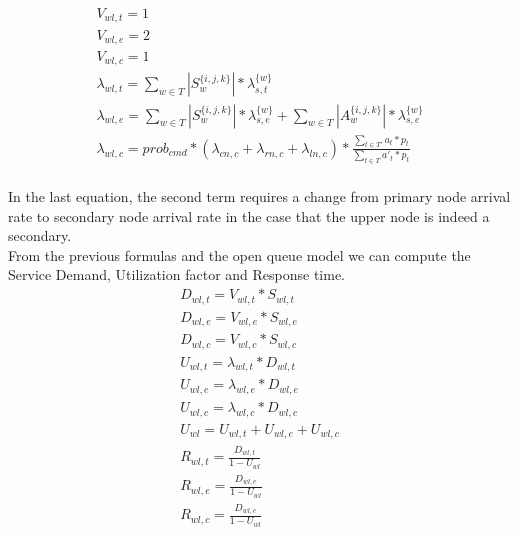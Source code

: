 \documentclass[11pt]{article}
\begin{document}
\begin{equation}
    \begin{array}{l}
        V_{wl, t} = 1 \\
        V_{wl, e} = 2 \\ %
        V_{wl,c} = 1 \\
        \lambda_{wl, t} = \sum\limits_{w \in T}{| S^{\{i,j,k\}}_{w} | * \lambda^{\{w\}}_{s, t}}  \\
        \lambda_{wl, e} = \sum\limits_{w \in T}{| S^{\{i,j,k\}}_{w} | * \lambda^{\{w\}}_{s, e}} + \sum\limits_{w \in T}{| A^{\{i,j,k\}}_{w} | * \lambda^{\{w\}}_{s, e}}\\
		\lambda_{wl, c} = prob_{cmd} * (\lambda_{cn, c} + \lambda_{rn, c} + \lambda_{ln, c}) * \frac{\sum\limits_{t \in T'}{a_{t} * p_{t}}}{\sum\limits_{t \in T}{a'_{t} * p_{t}}}  \\\


    \end{array}
\end{equation}







In the last equation, the second term requires a change from primary node arrival rate to secondary node arrival rate in the case that the upper node is indeed a secondary.\\
From the previous formulas and the open queue model we can compute the Service Demand, Utilization factor and Response time.
\begin{equation}
    \begin{array}{l}
        D_{wl, t} = V_{wl, t} * S_{wl, t} \\
        D_{wl, e} = V_{wl, e} * S_{wl, e} \\
        D_{wl, c} = V_{wl, c} * S_{wl, c} \\
        U_{wl, t} = \lambda_{wl, t} * D_{wl, t} \\
        U_{wl, e} = \lambda_{wl, e} * D_{wl, e} \\
        U_{wl, c} = \lambda_{wl, c} * D_{wl, c} \\
        U_{wl} = U_{wl, t} + U_{wl, e} + U_{wl, c} \\
        R_{wl, t} = \frac{D_{wl, t}}{1 - U_{wl}} \\
        R_{wl, e} = \frac{D_{wl, e}}{1 - U_{wl}} \\
        R_{wl, c} = \frac{D_{wl, c}}{1 - U_{wl}} \\
    \end{array}
\end{equation}
\end{document}
